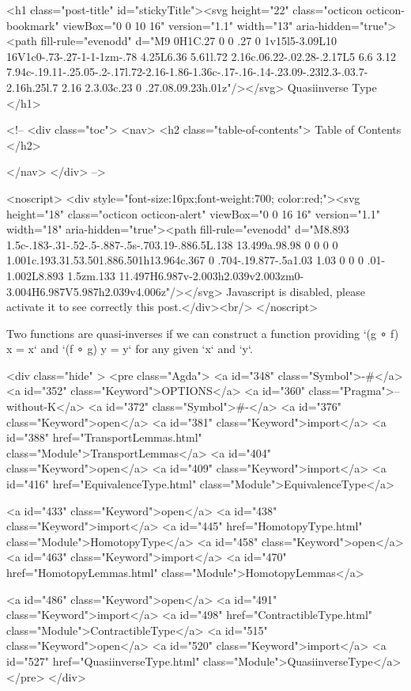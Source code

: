   <h1 class="post-title" id="stickyTitle"><svg height="22" class="octicon octicon-bookmark" viewBox="0 0 10 16" version="1.1" width="13" aria-hidden="true"><path fill-rule="evenodd" d="M9 0H1C.27 0 0 .27 0 1v15l5-3.09L10 16V1c0-.73-.27-1-1-1zm-.78 4.25L6.36 5.61l.72 2.16c.06.22-.02.28-.2.17L5 6.6 3.12 7.94c-.19.11-.25.05-.2-.17l.72-2.16-1.86-1.36c-.17-.16-.14-.23.09-.23l2.3-.03.7-2.16h.25l.7 2.16 2.3.03c.23 0 .27.08.09.23h.01z"/></svg> Quasiinverse Type
  </h1>

  <!-- 
  <div class="toc">
    <nav>
    <h2 class="table-of-contents"> Table of Contents </h2>
      

    </nav>
  </div>
   -->

  <noscript>
  <div style="font-size:16px;font-weight:700; color:red;"><svg height="18" class="octicon octicon-alert" viewBox="0 0 16 16" version="1.1" width="18" aria-hidden="true"><path fill-rule="evenodd" d="M8.893 1.5c-.183-.31-.52-.5-.887-.5s-.703.19-.886.5L.138 13.499a.98.98 0 0 0 0 1.001c.193.31.53.501.886.501h13.964c.367 0 .704-.19.877-.5a1.03 1.03 0 0 0 .01-1.002L8.893 1.5zm.133 11.497H6.987v-2.003h2.039v2.003zm0-3.004H6.987V5.987h2.039v4.006z"/></svg> Javascript is disabled, please activate it to see correctly this post.</div><br/>
  </noscript>

  Two functions are quasi-inverses if we can construct a function providing
`(g ∘ f) x = x` and `(f ∘ g) y = y` for any given `x` and `y`.

<div class="hide" >
<pre class="Agda">
<a id="348" class="Symbol">{-#</a> <a id="352" class="Keyword">OPTIONS</a> <a id="360" class="Pragma">--without-K</a> <a id="372" class="Symbol">#-}</a>
<a id="376" class="Keyword">open</a> <a id="381" class="Keyword">import</a> <a id="388" href="TransportLemmas.html" class="Module">TransportLemmas</a>
<a id="404" class="Keyword">open</a> <a id="409" class="Keyword">import</a> <a id="416" href="EquivalenceType.html" class="Module">EquivalenceType</a>

<a id="433" class="Keyword">open</a> <a id="438" class="Keyword">import</a> <a id="445" href="HomotopyType.html" class="Module">HomotopyType</a>
<a id="458" class="Keyword">open</a> <a id="463" class="Keyword">import</a> <a id="470" href="HomotopyLemmas.html" class="Module">HomotopyLemmas</a>

<a id="486" class="Keyword">open</a> <a id="491" class="Keyword">import</a> <a id="498" href="ContractibleType.html" class="Module">ContractibleType</a>
<a id="515" class="Keyword">open</a> <a id="520" class="Keyword">import</a> <a id="527" href="QuasiinverseType.html" class="Module">QuasiinverseType</a>
</pre>
</div>

